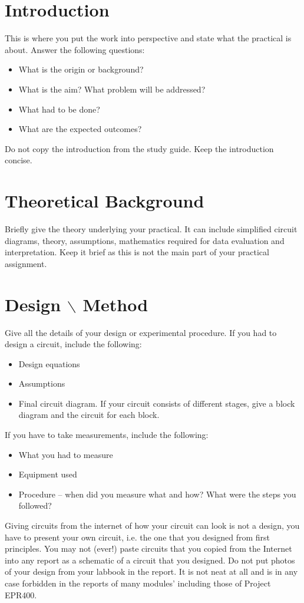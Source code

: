 \documentclass[a4paper,12pt]{report}
\begin{document}


\pagebreak
\tableofcontents
\pagebreak

\setcounter{page}{1}

\section{Introduction}
This is where you put the work into perspective and state what the practical is about. Answer the following questions:
\begin{itemize}
\item What is the origin or background?
\item What is the aim? What problem will be addressed?
\item What had to be done?
\item What are the expected outcomes?
\end{itemize}
Do not copy the introduction from the study guide. Keep the introduction concise.

\section{Theoretical Background}
Briefly give the theory underlying your practical. It can include simplified circuit diagrams, theory, assumptions, mathematics required for data evaluation and interpretation. Keep it brief as this is not the main part of your practical assignment.
\section{Design $\backslash$ Method}
Give all the details of your design or experimental procedure.
If you had to design a circuit, include the following:
\begin{itemize}
\item Design equations
\item Assumptions
\item Final circuit diagram. If your circuit consists of different stages, give a block diagram and the circuit for each block.
\end{itemize}

If you have to take measurements, include the following:
\begin{itemize}
\item What you had to measure
\item Equipment used
\item Procedure – when did you measure what and how? What were the steps you followed?
\end{itemize}
Giving circuits from the internet of how your circuit can look is not a design, you have to present your own circuit, i.e. the one that you designed from first principles. You may not (ever!) paste circuits that you copied from the Internet into any report as a schematic of a circuit that you designed.
Do not put photos of your design from your labbook in the report. It is not neat at all and is in any case forbidden in the reports of many modules' including those of Project EPR400.
\end{document}
